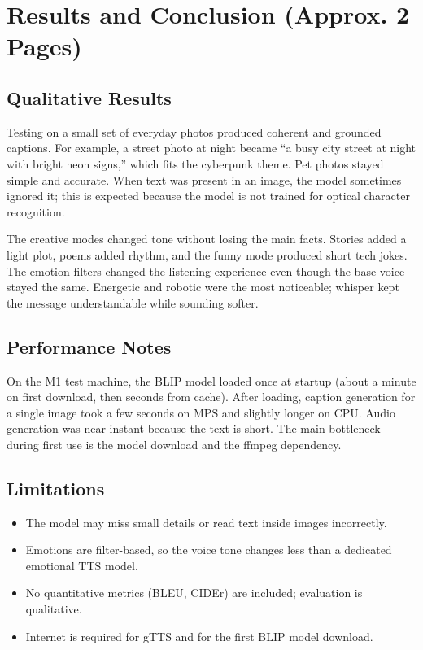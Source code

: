 \documentclass[11pt]{article}
\begin{document}
\section{Results and Conclusion (Approx. 2 Pages)}
\subsection{Qualitative Results}
Testing on a small set of everyday photos produced coherent and grounded captions. For example, a street photo at night became ``a busy city street at night with bright neon signs,'' which fits the cyberpunk theme. Pet photos stayed simple and accurate. When text was present in an image, the model sometimes ignored it; this is expected because the model is not trained for optical character recognition.

The creative modes changed tone without losing the main facts. Stories added a light plot, poems added rhythm, and the funny mode produced short tech jokes. The emotion filters changed the listening experience even though the base voice stayed the same. Energetic and robotic were the most noticeable; whisper kept the message understandable while sounding softer.

\subsection{Performance Notes}
On the M1 test machine, the BLIP model loaded once at startup (about a minute on first download, then seconds from cache). After loading, caption generation for a single image took a few seconds on MPS and slightly longer on CPU. Audio generation was near-instant because the text is short. The main bottleneck during first use is the model download and the ffmpeg dependency.

\subsection{Limitations}
\begin{itemize}
    \item The model may miss small details or read text inside images incorrectly.
    \item Emotions are filter-based, so the voice tone changes less than a dedicated emotional TTS model.
    \item No quantitative metrics (BLEU, CIDEr) are included; evaluation is qualitative.
    \item Internet is required for gTTS and for the first BLIP model download.
\end{itemize}
\end{document}
